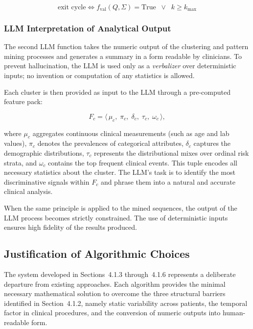 \begin{equation}
    \text{exit cycle} \iff f_{\mathrm{val}}(Q,\Sigma) = \mathrm{True} \;\;\lor\;\; k \ge k_{\max}
    \label{eq:exit}
\end{equation}

\subsubsection*{LLM Interpretation of Analytical Output}

The second LLM function takes the numeric output of the clustering and pattern mining processes and generates a summary in a form readable by clinicians. To prevent hallucination, the LLM is used only as a \emph{verbalizer} over deterministic inputs; no invention or computation of any statistics is allowed.

Each cluster is then provided as input to the LLM through a pre-computed feature pack:

\begin{equation}
    F_c = \langle\, \mu_c,\; \pi_c,\; \delta_c,\; \tau_c,\; \omega_c \,\rangle,
    \label{eq:feature_pack}
\end{equation}

where $\mu_c$ aggregates continuous clinical measurements (such as age and lab values), $\pi_c$ denotes the prevalences of categorical attributes, $\delta_c$ captures the demographic distributions, $\tau_c$ represents the distributional mixes over ordinal risk strata, and $\omega_c$ contains the top frequent clinical events. This tuple encodes all necessary statistics about the cluster. The LLM's task is to identify the most discriminative signals within $F_c$ and phrase them into a natural and accurate clinical analysis.

When the same principle is applied to the mined sequences, the output of the LLM process becomes strictly constrained. The use of deterministic inputs ensures high fidelity of the results produced.
\subsection{Justification of Algorithmic Choices}

The system developed in Sections~4.1.3 through~4.1.6 represents a deliberate departure from existing approaches. Each algorithm provides the minimal necessary mathematical solution to overcome the three structural barriers identified in Section~4.1.2, namely static variability across patients, the temporal factor in clinical procedures, and the conversion of numeric outputs into human-readable form.

